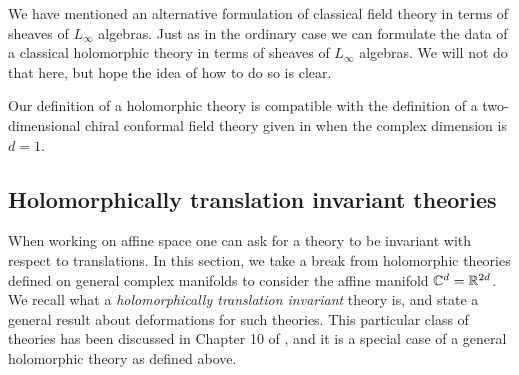 \documentclass[11pt]{amsart}
\begin{document}
%

\begin{rmk}
We have mentioned an alternative formulation of classical field theory in terms of sheaves of $L_\infty$ algebras.
Just as in the ordinary case we can formulate the data of a classical holomorphic theory in terms of sheaves of $L_\infty$ algebras. 
We will not do that here, but hope the idea of how to do so is clear.
\end{rmk}

\begin{rmk}
Our definition of a holomorphic theory is compatible with the definition of a two-dimensional chiral conformal field theory given in \cite{LiVertex} when the complex dimension is $d=1$.
\end{rmk}

\subsection{Holomorphically translation invariant theories} \label{sec: hol trans}

When working on affine space one can ask for a theory to be invariant with respect to translations. 
In this section, we take a break from holomorphic theories defined on general complex manifolds to consider the affine manifold $\mathbb C^d = \mathbb R^{2d}$.
We recall what a {\em holomorphically translation invariant} theory is, and state a general result about deformations for such theories. 
This particular class of theories has been discussed in Chapter 10 of \cite{CG2}, and it is a special case of a general holomorphic theory as defined above.  
\end{document}
